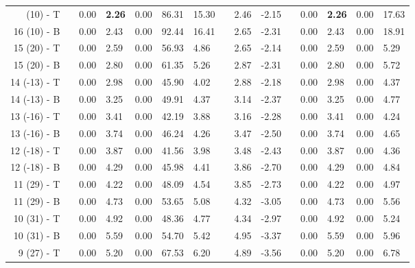 \begin{table}[H]
\begin{longtable}{@{}rllllllllllllll@{}}
\bottomrule
\endlastfoot
  16 (10) - T &&    0.00 &    \textbf{\large 2.26} &    0.00 &   86.31 & 15.30 && 2.46 & -2.15 &&     0.00 &     \textbf{\large 2.26} &     0.00 &    17.63 \\
  16 (10) - B &&    0.00 &    2.43 &    0.00 &   92.44 & 16.41 && 2.65 & -2.31 &&     0.00 &     2.43 &     0.00 &    18.91 \\\midrule
  15 (20) - T &&    0.00 &    2.59 &    0.00 &   56.93 &  4.86 && 2.65 & -2.14 &&     0.00 &     2.59 &     0.00 &     5.29 \\
  15 (20) - B &&    0.00 &    2.80 &    0.00 &   61.35 &  5.26 && 2.87 & -2.31 &&     0.00 &     2.80 &     0.00 &     5.72 \\\midrule
 14 (-13) - T &&    0.00 &    2.98 &    0.00 &   45.90 &  4.02 && 2.88 & -2.18 &&     0.00 &     2.98 &     0.00 &     4.37 \\
 14 (-13) - B &&    0.00 &    3.25 &    0.00 &   49.91 &  4.37 && 3.14 & -2.37 &&     0.00 &     3.25 &     0.00 &     4.77 \\\midrule
 13 (-16) - T &&    0.00 &    3.41 &    0.00 &   42.19 &  3.88 && 3.16 & -2.28 &&     0.00 &     3.41 &     0.00 &     4.24 \\
 13 (-16) - B &&    0.00 &    3.74 &    0.00 &   46.24 &  4.26 && 3.47 & -2.50 &&     0.00 &     3.74 &     0.00 &     4.65 \\\midrule
 12 (-18) - T &&    0.00 &    3.87 &    0.00 &   41.56 &  3.98 && 3.48 & -2.43 &&     0.00 &     3.87 &     0.00 &     4.36 \\
 12 (-18) - B &&    0.00 &    4.29 &    0.00 &   45.98 &  4.41 && 3.86 & -2.70 &&     0.00 &     4.29 &     0.00 &     4.84 \\\midrule
  11 (29) - T &&    0.00 &    4.22 &    0.00 &   48.09 &  4.54 && 3.85 & -2.73 &&     0.00 &     4.22 &     0.00 &     4.97 \\
  11 (29) - B &&    0.00 &    4.73 &    0.00 &   53.65 &  5.08 && 4.32 & -3.05 &&     0.00 &     4.73 &     0.00 &     5.56 \\\midrule
  10 (31) - T &&    0.00 &    4.92 &    0.00 &   48.36 &  4.77 && 4.34 & -2.97 &&     0.00 &     4.92 &     0.00 &     5.24 \\
  10 (31) - B &&    0.00 &    5.59 &    0.00 &   54.70 &  5.42 && 4.95 & -3.37 &&     0.00 &     5.59 &     0.00 &     5.96 \\\midrule
   9 (27) - T &&    0.00 &    5.20 &    0.00 &   67.53 &  6.20 && 4.89 & -3.56 &&     0.00 &     5.20 &     0.00 &     6.78 \\

\end{longtable}
\end{table}

